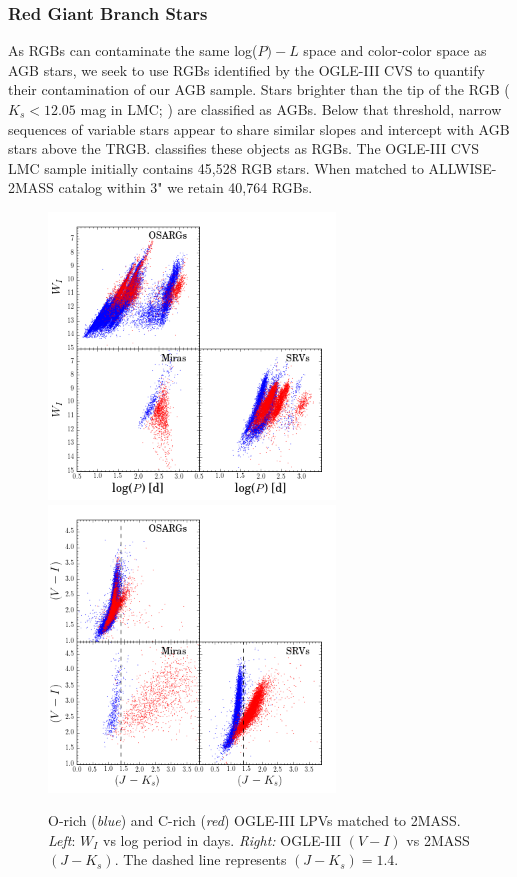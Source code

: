 \subsubsection{Red Giant Branch Stars}
As RGBs can contaminate the same log($P)-L$ space and color-color space as AGB stars, we seek to use RGBs identified by the OGLE-III CVS to quantify their contamination of our AGB sample. Stars brighter than the tip of the RGB ($K_s < 12.05$ mag in LMC; \citealt{2004AcA....54..129S, 2007AcA....57..201S}) are classified as AGBs. Below that threshold, narrow sequences of variable stars appear to share similar slopes and intercept with AGB stars above the TRGB. \cite{2004AcA....54..129S} classifies these objects as RGBs. The OGLE-III CVS LMC sample initially contains 45,528 RGB stars. When matched to ALLWISE-2MASS catalog within 3" we retain 40,764 RGBs.

\begin{figure}[h]
\includegraphics[width=3in]{figs/ogle_2mass_period_mag_threeplot.png}
\includegraphics[width=3in]{figs/ogle_2mass_color_color_threeplot.png}
\caption{O-rich (\emph{blue}) and C-rich (\emph{red}) OGLE-III LPVs matched to 2MASS. \emph{Left}: $W_I$ vs log period in days. \emph{Right:} OGLE-III $(V-I)$ vs 2MASS $(J-K_s)$. The dashed line represents $(J-K_s) = 1.4$. \label{fig:oglepmag}}
\end{figure}

